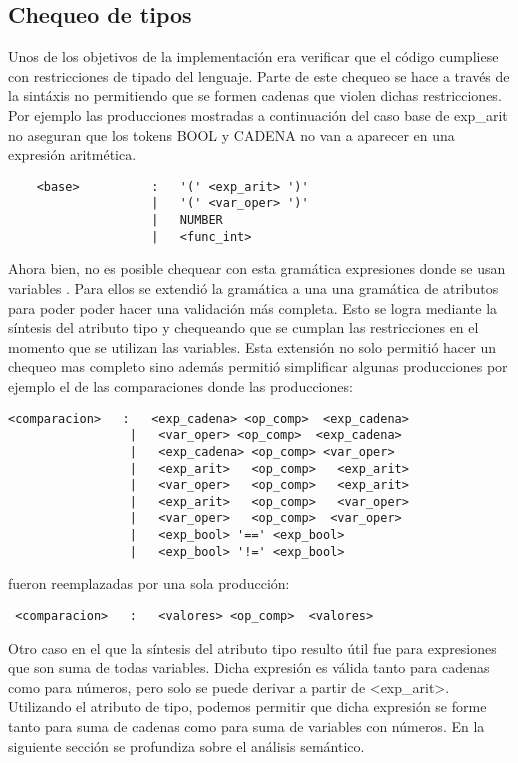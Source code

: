 \subsection{Chequeo de tipos}

Unos de los objetivos de la implementación era verificar que el código cumpliese con restricciones de tipado del lenguaje. Parte de este chequeo se hace a través de la sintáxis no permitiendo  que se formen cadenas que violen dichas restricciones. 
Por ejemplo las producciones mostradas a continuación del caso  base de exp\_arit no aseguran que los tokens BOOL y CADENA no van a aparecer en una expresión aritmética. 
\begin{verbatim}
    <base>          :   '(' <exp_arit> ')'
                    |   '(' <var_oper> ')'
                    |   NUMBER
                    |   <func_int>

\end{verbatim}
	Ahora bien, no es posible chequear con esta gramática expresiones donde se usan variables . Para ellos se extendió la gramática a una una gramática de atributos para poder poder hacer una validación más completa. Esto se logra mediante la síntesis del atributo tipo y chequeando que se cumplan las restricciones en el momento que se utilizan las variables. Esta extensión no solo permitió hacer un chequeo mas completo sino además permitió simplificar algunas producciones por ejemplo el de las comparaciones donde las producciones:
    
\begin{verbatim}
<comparacion>   :   <exp_cadena> <op_comp>  <exp_cadena>
                 |   <var_oper> <op_comp>  <exp_cadena>
                 |   <exp_cadena> <op_comp> <var_oper> 
                 |   <exp_arit>   <op_comp>   <exp_arit>
                 |   <var_oper>   <op_comp>   <exp_arit>
                 |   <exp_arit>   <op_comp>   <var_oper>
                 |   <var_oper>   <op_comp>  <var_oper>
                 |   <exp_bool> '==' <exp_bool>
                 |   <exp_bool> '!=' <exp_bool>
\end{verbatim}
fueron reemplazadas por una sola producción:
\begin{verbatim}
 <comparacion>   :   <valores> <op_comp>  <valores>
\end{verbatim}
 
Otro caso en el que la síntesis del atributo tipo resulto útil fue para expresiones que son suma de todas variables. Dicha expresión es válida tanto para cadenas como para números, pero solo se puede derivar a partir de <exp\_arit>. Utilizando el atributo de tipo, podemos permitir que dicha expresión se forme tanto para suma de cadenas como para suma de variables con números.
    En la siguiente sección se profundiza sobre el análisis semántico.


